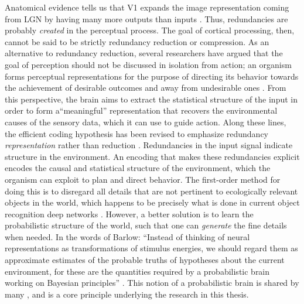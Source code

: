 Anatomical evidence tells us that V1 expands the image representation coming from LGN by having many more outputs than inputs \parencite{olshausen2003principles}. Thus, redundancies are probably \textit{created} in the perceptual process. The goal of cortical processing, then, cannot be said to be strictly redundancy reduction or compression. As an alternative to redundancy reduction, several researchers have argued that the goal of perception should not be discussed in isolation from action; an organism forms perceptual representations for the purpose of directing its behavior towards the achievement of desirable outcomes and away from undesirable ones \parencite{barlow2001redundancy, simoncelli2001natural}. From this perspective, the brain aims to extract the statistical structure of the input in order to form a``meaningful'' representation that recovers the environmental causes of the sensory data, which it can use to guide action. Along these lines, the efficient coding hypothesis has been revised to emphasize redundancy \textit{representation} rather than reduction \parencite{barlow2001redundancy}. Redundancies in the input signal indicate structure in the environment. An encoding that makes these redundancies explicit encodes the causal and statistical structure of the environment, which the organism can exploit to plan and direct behavior. The first-order method for doing this is to disregard all details that are not pertinent to ecologically relevant objects in the world, which happens to be precisely what is done in current object recognition deep networks \parencite{tishby2015deep}. However, a better solution is to learn the probabilistic structure of the world, such that one can \textit{generate} the fine details when needed. In the words of Barlow: ``Instead of thinking of neural representations as transformations of stimulus energies, we should regard them as approximate estimates of the probable truths of hypotheses about the current environment, for these are the quantities required by a probabilistic brain working on Bayesian principles'' \parencite{barlow2001redundancy}. This notion of a probabilistic brain is shared by many \parencite{kersten2004object, lee2003hierarchical, lewicki1997bayesian, olshausen2013perception}, and is a core principle underlying the research in this thesis.

